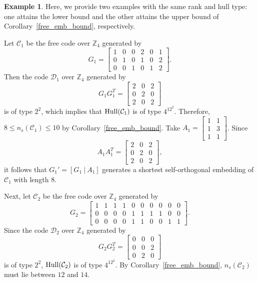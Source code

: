 \documentclass{article}
\theoremstyle{definition}
\newtheorem{example}{Example}[section]
\theoremstyle{remark}
\begin{document}
\begin{example}\label{ex1}
    Here, we provide two examples with the same rank and hull type: one attains the lower bound and the other attains the upper bound of Corollary~\ref{free_emb_bound}, respectively.

    Let $\mathcal{C}_1$ be the free code over $\mathbb{Z}_4$ generated by
    \[
    G_1=\begin{bmatrix}
        1 & 0 & 0 & 2 & 0 & 1\\0 & 1 & 0 & 1 & 0 & 2\\0 & 0 & 1 & 0 & 1 & 2
    \end{bmatrix}.
    \]
    Then the code $\mathcal{D}_1$ over $\mathbb{Z}_4$ generated by
    \[
    G_1G_1^T=\begin{bmatrix}
        2 & 0 & 2\\0 & 2 & 0\\2 & 0 & 2
    \end{bmatrix}
    \]
    is of type $2^2$, which implies that ${\rm Hull}(\mathcal{C}_1)$ is of type $4^12^2$. Therefore, $8\le n_s(\mathcal{C}_1)\le 10$ by Corollary~\ref{free_emb_bound}. Take $A_1=\begin{bmatrix} 1 & 1\\1 & 3\\1 & 1 \end{bmatrix}$. Since 
    \[
    A_1A_1^T=\begin{bmatrix}
        2 & 0 & 2\\0 & 2 & 0\\2 & 0 & 2
    \end{bmatrix},
    \]
    it follows that $G_1'=[G_1~|~A_1]$ generates a shortest self-orthogonal embedding of $\mathcal{C}_1$ with length $8$.

    Next, let $\mathcal{C}_2$ be the free code over $\mathbb{Z}_4$ generated by
    \[
    G_2=\begin{bmatrix}
        1 & 1 & 1 & 1 & 0 & 0 & 0 & 0 & 0 & 0\\0 & 0 & 0 & 0 & 1 & 1 & 1 & 1 & 0 & 0\\0 & 0 & 0 & 0 & 1 & 1 & 0 & 0 & 1 & 1
    \end{bmatrix}.
    \]
    Since the code $\mathcal{D}_2$ over $\mathbb{Z}_4$ generated by
    \[
    G_2G_2^T=\begin{bmatrix}
        0 & 0 & 0\\0 & 0 & 2\\0 & 2 & 0
    \end{bmatrix}
    \]
    is of type $2^2$, ${\rm Hull}(\mathcal{C}_2)$ is of type $4^12^2$. By Corollary~\ref{free_emb_bound}, $n_s(\mathcal{C}_2)$ must lie between $12$ and $14$. 
    

\end{example}
\end{document}
